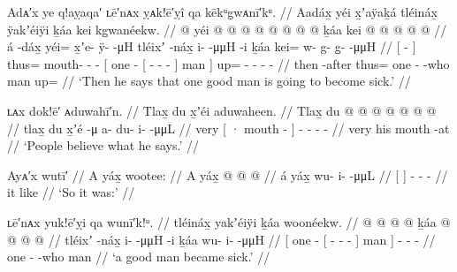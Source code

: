 \ex\label{ex:100-206-one-good-man-sick}%
%
\begingl
	\glpreamble	Adᴀ′x ye q!aỵaqa′ ʟē′nᴀx ỵᴀk!ē′ỵî qa kēkᵘg̣wᴀnī′kᵘ. //
	\glpreamble	Aadáx̱ yéi x̱ʼaÿaḵá tléináx̱ ÿakʼéiÿi ḵáa kei kg̱wanéekw. //
	\gla	{}  @ {} {} 
		yéi @  @ {} @ {} @ {}
		{}  @ {} {}  @ {} @ {} @ {} {} ḵáa {}
		kei @  @ {} @ {} @ {} @ {} //
	\glb	{} á -dáx̱ {} 
		yéi= x̱ʼe- ÿ-  -μH
		{} tléixʼ -náx̱ {} i-  -μμH\hspace{0.5ex} -i {} ḵáa {}
		kei= w- g- g̱-  -μμH //
	\glc	{}[  - {}]
		thus= mouth- -  -
		{}[ one - {}[ -  - - {}] man {}]
		up= - - -  - //
	\gld	{} then -after {} thus=  {} {} {}
		{} one - {}  {} {} -who {} man {}
		up=  {} {} {} //
	\glft	‘Then he says that one good man is going to become sick.’
		//
\endgl
\xe

\ex\label{ex:100-207-they-believe}%
%
\begingl
	\glpreamble	ʟᴀx dok!ē′ ᴀduwahī′n. //
	\glpreamble	Tlax̱ du x̱ʼéi aduwaheen. //
	\gla	Tlax̱ {} du  @ {} {} 
		 @ {} @ {} @ {} @ {} @ {} @ {} //
	\glb	tlax̱ {} du x̱ʼé -μ {} 
		a- du- i-  -μμL //
	\glc	very {}[ · mouth - {}]
		- - -  - //
	\gld	very {} his mouth -at {}
		 {} {} {} {} {} {} //
	\glft	‘People believe what he says.’
		//
\endgl
\xe

\ex\label{ex:100-208-so-it-was}%
%
\begingl
	\glpreamble	Ayᴀ′x wutī′ //
	\glpreamble	A yáx̱ wootee: //
	\gla	{} A yáx̱ {}
		 @ {} @ {} @ {} //
	\glb	{} á yáx̱ {}
		wu- i-  -μμL //
	\glc	{}[   {}]
		- -  - //
	\gld	{} it like {}
		 {} {} {} //
	\glft	‘So it was:’
		//
\endgl
\xe

\ex\label{ex:100-209-good-man-got-sick}%
%
\begingl
	\glpreamble	ʟē′nᴀx yuk!ē′ỵi qa wunī′k!ᵘ. //
	\glpreamble	tléináx̱ yakʼéiÿi ḵáa woonéekw. //
	\gla	{}  @ {}
			{}  @ {} @ {} @ {} {} ḵáa {}
		 @ {} @ {} @ {} @ {} //
	\glb	{} tléixʼ -náx̱
			{} i-  -μμH -i {} ḵáa {}
		wu- i-  -μμH //
	\glc	{}[ one -
			{}[ -  - - {}] man {}]
		- -  - //
	\gld	{} one -
			{}  {} {} -who {} man {}
		 {} {} {} {} //
	\glft	‘a good man became sick.’
		//
\endgl
\xe


